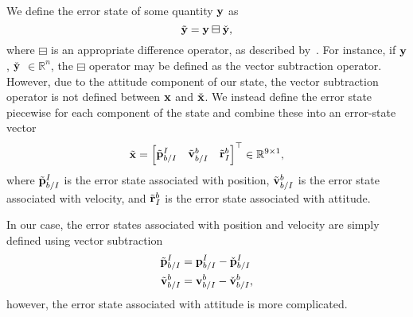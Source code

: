 We define the error state of some quantity $\boldsymbol{\mathrm{y}}$ as
\begin{equation}
  \tilde{\boldsymbol{\mathrm{y}}}=\boldsymbol{\mathrm{y}} \boxminus \check{\boldsymbol{\mathrm{y}}},
  \label{eq:error}
\end{equation}
where $\boxminus$ is an appropriate difference operator, as described
by~\cite{hertzberg2013integrating}.  For instance, if $\boldsymbol{\mathrm{y}}$, 
$\check{\boldsymbol{\mathrm{y}}}$ $\in \mathbb{R}^{n}$, the $\boxminus$ operator may be
defined as the vector subtraction operator. However, due to the attitude component of our
state, the vector subtraction operator is not defined between $\boldsymbol{\mathrm{x}}$ and
$\check{\boldsymbol{\mathrm{x}}}$. We instead define the
error state piecewise for
each component of the state and combine these into an error-state vector
\begin{equation}
  \tilde{\boldsymbol{\mathrm{x}}}=\begin{bmatrix}{\tilde{\boldsymbol{\mathrm{p}}}}_{b/I}^{I} &
  \tilde{\boldsymbol{\mathrm{v}}}_{b/I}^{b} &
\tilde{\boldsymbol{\mathrm{r}}}_{I}^{b}\end{bmatrix}^{\top}\in\mathbb{R}^{9\times1},
  \label{eq:error_state}
\end{equation}
where $\tilde{\boldsymbol{\mathrm{p}}}_{b/I}^{I}$ is the error state associated with
position, $\tilde{\boldsymbol{\mathrm{v}}}_{b/I}^{b}$ is the error state associated with
velocity, and $\tilde{\boldsymbol{\mathrm{r}}}_{I}^{b}$ is the error state associated
with attitude.

In our case, the error states associated with
position and velocity are simply defined using vector subtraction
\begin{align}
  \label{eq:pos_err}
  \tilde{\boldsymbol{\mathrm{p}}}_{b/I}^{I} &= \boldsymbol{\mathrm{p}}_{b/I}^{I} - \check{\boldsymbol{\mathrm{p}}}_{b/I}^{I} \\
  \tilde{\boldsymbol{\mathrm{v}}}_{b/I}^{b} &= \boldsymbol{\mathrm{v}}_{b/I}^{b} - \check{\boldsymbol{\mathrm{v}}}_{b/I}^{b},
  \label{eq:vel_err}
\end{align}
however, the error state associated with attitude is more complicated.


